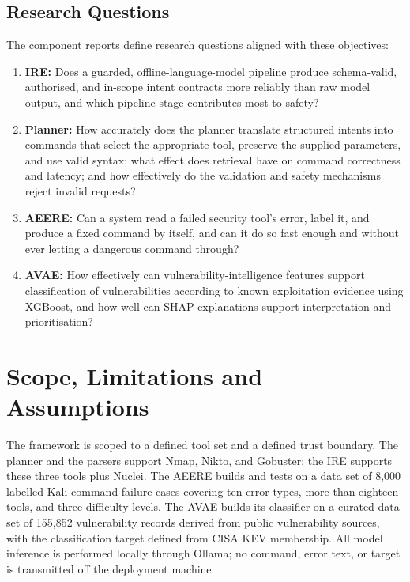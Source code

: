 \subsection{Research Questions}\label{sec:rqs}

The component reports define research questions aligned with these objectives:

\begin{enumerate}
  \item \textbf{IRE:} Does a guarded, offline-language-model pipeline produce
  schema-valid, authorised, and in-scope intent contracts more reliably than raw
  model output, and which pipeline stage contributes most to safety?
  \item \textbf{Planner:} How accurately does the planner translate structured
  intents into commands that select the appropriate tool, preserve the supplied
  parameters, and use valid syntax; what effect does retrieval have on command
  correctness and latency; and how effectively do the validation and safety
  mechanisms reject invalid requests?
  \item \textbf{AEERE:} Can a system read a failed security tool's error,
  label it, and produce a fixed command by itself, and can it do so fast enough
  and without ever letting a dangerous command through?
  \item \textbf{AVAE:} How effectively can vulnerability-intelligence features
  support classification of vulnerabilities according to known exploitation
  evidence using XGBoost, and how well can SHAP explanations support
  interpretation and prioritisation?
\end{enumerate}

\section{Scope, Limitations and Assumptions}\label{sec:scope}

The framework is scoped to a defined tool set and a defined trust boundary. The
planner and the parsers support Nmap, Nikto, and Gobuster; the IRE supports these
three tools plus Nuclei. The AEERE builds and tests on a data set of 8,000
labelled Kali command-failure cases covering ten error types, more than eighteen
tools, and three difficulty levels. The AVAE builds its classifier on a
curated data set of 155,852 vulnerability records derived from public
vulnerability sources, with the classification target defined from CISA KEV
membership. All model inference is performed locally through Ollama; no command,
error text, or target is transmitted off the deployment machine.

